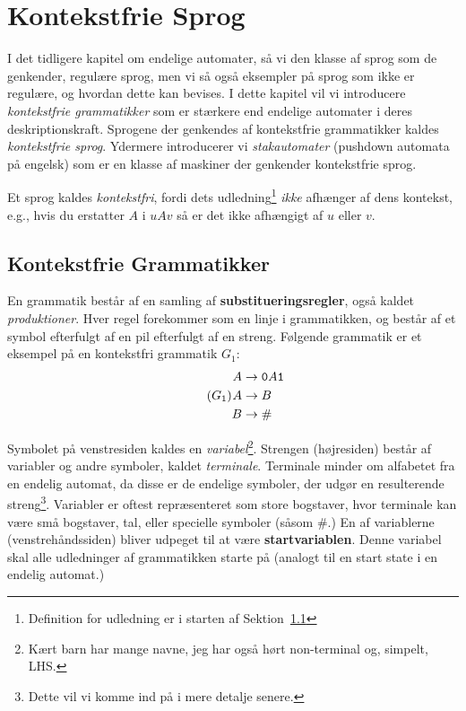 \chapter{Kontekstfrie Sprog}

I det tidligere kapitel om endelige automater, så vi den klasse af sprog som de genkender, regulære sprog, men vi så også eksempler på sprog som ikke er regulære, og hvordan dette kan bevises. I dette kapitel vil vi introducere \textit{kontekstfrie grammatikker} som er stærkere end endelige automater i deres deskriptionskraft. Sprogene der genkendes af kontekstfrie grammatikker kaldes \textit{kontekstfrie sprog}. Ydermere introducerer vi \textit{stakautomater} (pushdown automata på engelsk) som er en klasse af maskiner der genkender kontekstfrie sprog.

Et sprog kaldes \textit{kontekstfri}, fordi dets udledning\footnote{Definition for udledning  er i starten af Sektion~\ref{sec:cfg}} \textit{ikke} afhænger af dens kontekst, e.g., hvis du erstatter $A$ i $uAv$ så er det ikke afhængigt af $u$ eller $v$.

\section{Kontekstfrie Grammatikker}
\label{sec:cfg}
En grammatik består af en samling af \textbf{substitueringsregler}, også kaldet \textit{produktioner}. Hver regel forekommer som en linje i grammatikken,  og består af et symbol efterfulgt af en pil efterfulgt af en streng. Følgende grammatik er et eksempel på en kontekstfri grammatik $G_{1}$:
\begin{equation}
	\tag{$G_{1}$}
	\begin{split}
		A & \rightarrow \mathtt{0}A \mathtt{1} \\
		A & \rightarrow B                      \\
		B & \rightarrow \mathtt{\#}
	\end{split}
	\label{eqn:G1}
\end{equation}

Symbolet på venstresiden kaldes en \textit{variabel}\footnote{Kært barn har mange navne, jeg har også hørt non-terminal og, simpelt, LHS.}. Strengen (højresiden) består af variabler og andre symboler, kaldet \textit{terminale}. Terminale minder om alfabetet fra en endelig automat, da disse er de endelige symboler, der udgør en resulterende streng\footnote{Dette vil vi komme ind på i mere detalje senere.}. Variabler er oftest repræsenteret som store bogstaver, hvor terminale kan være små bogstaver, tal, eller specielle symboler (såsom \#.) En af variablerne (venstrehåndssiden) bliver udpeget til at være \textbf{startvariablen}. Denne variabel skal alle udledninger af grammatikken starte på (analogt til en start state i en endelig automat.)

